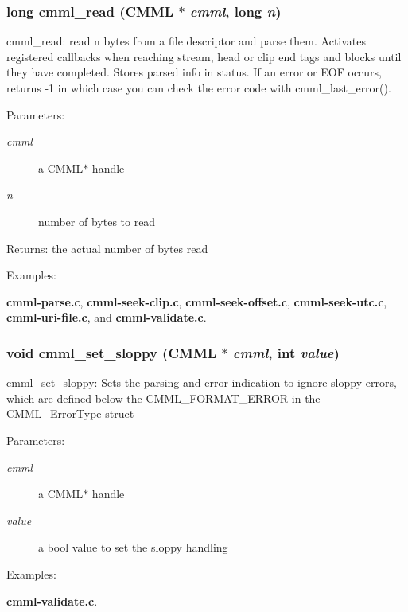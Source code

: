 \subsubsection{\setlength{\rightskip}{0pt plus 5cm}long cmml\_\-read ({\bf CMML} $\ast$ {\em cmml}, long {\em n})}\label{cmml_8h_a42}


cmml\_\-read: read n bytes from a file descriptor and parse them. Activates registered callbacks when reaching stream, head or clip end tags and blocks until they have completed. Stores parsed info in status. If an error or EOF occurs, returns -1 in which case you can check the error code with cmml\_\-last\_\-error().

\begin{Desc}
\item[Parameters:]
\begin{description}
\item[{\em cmml}]a CMML$\ast$ handle \item[{\em n}]number of bytes to read\end{description}
\end{Desc}
\begin{Desc}
\item[Returns:]the actual number of bytes read \end{Desc}
\begin{Desc}
\item[Examples: ]\par
{\bf cmml-parse.c}, {\bf cmml-seek-clip.c}, {\bf cmml-seek-offset.c}, {\bf cmml-seek-utc.c}, {\bf cmml-uri-file.c}, and {\bf cmml-validate.c}.\end{Desc}
\subsubsection{\setlength{\rightskip}{0pt plus 5cm}void cmml\_\-set\_\-sloppy ({\bf CMML} $\ast$ {\em cmml}, int {\em value})}\label{cmml_8h_a43}


cmml\_\-set\_\-sloppy: Sets the parsing and error indication to ignore sloppy errors, which are defined below the CMML\_\-FORMAT\_\-ERROR in the CMML\_\-Error\-Type struct

\begin{Desc}
\item[Parameters:]
\begin{description}
\item[{\em cmml}]a CMML$\ast$ handle \item[{\em value}]a bool value to set the sloppy handling \end{description}
\end{Desc}
\begin{Desc}
\item[Examples: ]\par
{\bf cmml-validate.c}.\end{Desc}
